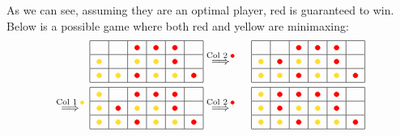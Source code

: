 \documentclass{article}
\begin{document}
As we can see, assuming they are an optimal player, red is guaranteed to win. Below is a possible game where both red and yellow are minimaxing:
\begin{alignat*}{2}
  &\begin{tabular}{| c | c | c | c | c | c |}
    \hline
    & & \re & \re & \re & \\ \hline
    \ye & & \ye & \ye & \re & \\ \hline
    \ye & \ye & \re & \ye & \ye & \re \\
    \hline
  \end{tabular}\overset{\text{Col 2 \re}}{\Longrightarrow}\,\,\,
  &&\begin{tabular}{| c | c | c | c | c | c |}
    \hline
    & & \re & \re & \re & \\ \hline
    \ye & \re & \ye & \ye & \re & \\ \hline
    \ye & \ye & \re & \ye & \ye & \re \\
    \hline
  \end{tabular}\\\overset{\text{Col 1 \ye}}{\Longrightarrow}\,\,\,
  &\begin{tabular}{| c | c | c | c | c | c |}
    \hline
    \ye & & \re & \re & \re & \\ \hline
    \ye & \re & \ye & \ye & \re & \\ \hline
    \ye & \ye & \re & \ye & \ye & \re \\
    \hline
  \end{tabular}\overset{\text{Col 2 \re}}{\Longrightarrow}\,\,\,
  &&\begin{tabular}{| c | c | c | c | c | c |}
    \hline
    \ye & \re & \re & \re & \re & \\ \hline
    \ye & \re & \ye & \ye & \re & \\ \hline
    \ye & \ye & \re & \ye & \ye & \re \\
    \hline
  \end{tabular}
\end{alignat*}

\newpage
\end{document}
